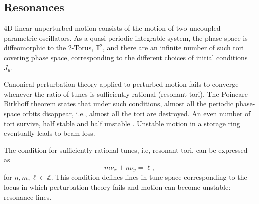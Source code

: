 \subsection{Resonances}
\label{subsec:resons}

4D linear unperturbed motion consists of the motion of two uncoupled parametric oscillators. As a quasi-periodic integrable system, the phase-space is diffeomorphic to the 2-Torus, $\mathbb{T}^2$, and there are an infinite number of such tori covering phase space, corresponding to the different choices of initial conditions $J_u$.

Canonical perturbation theory applied to perturbed motion fails to converge whenever the ratio of tunes is sufficiently rational (resonant tori). The Poincare-Birkhoff theorem states that under such conditions, almost all the periodic phase-space orbits disappear, i.e., almost all the tori are destroyed. An even number of tori survive, half stable and half unstable \cite[section 10.2]{marcus_mecanica2023}. Unstable motion in a storage ring eventually leads to beam loss.

The condition for sufficiently rational tunes, i.e, resonant tori, can be expressed as
\begin{equation}
        m\nu_x + n\nu_y = \ell,
        \label{eq:resonance_condition}
\end{equation}
    for $n, m, \ell\in\mathbb{Z}$. This condition defines lines in tune-space corresponding to the locus in which perturbation theory fails and motion can become unstable: resonance lines.

